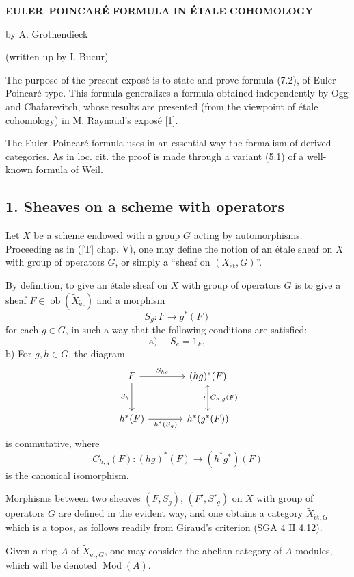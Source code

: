 \documentclass[11pt]{article}
\providecommand{\et}{\mathrm{\acute{e}t}}
\providecommand{\Ob}{\operatorname{ob}}
\providecommand{\Ob}{\operatorname{ob}}
\providecommand{\Ob}{\operatorname{Ob}}
\providecommand{\Mod}{\operatorname{Mod}}
\providecommand{\Ob}{\operatorname{ob}}
\providecommand{\Ob}{\operatorname{Ob}}
\providecommand{\et}{\acute{e}t}
\begin{document}
\begin{center}
\textbf{EULER--POINCARÉ FORMULA IN ÉTALE COHOMOLOGY}

by A. Grothendieck

(written up by I. Bucur)
\end{center}

The purpose of the present exposé is to state and prove formula (7.2), of Euler--Poincaré type. This formula generalizes a formula obtained independently by Ogg and Chafarevitch, whose results are presented (from the viewpoint of étale cohomology) in M. Raynaud's exposé [1].

The Euler--Poincaré formula uses in an essential way the formalism of derived categories. As in loc. cit. the proof is made through a variant (5.1) of a well-known formula of Weil.

\subsection*{1. Sheaves on a scheme with operators}

Let $X$ be a scheme endowed with a group $G$ acting by automorphisms. Proceeding as in ([T] chap. V), one may define the notion of an étale sheaf on $X$ with group of operators $G$, or simply a “sheaf on $(X_{\et},G)$”.

By definition, to give an étale sheaf on $X$ with group of operators $G$ is to give a sheaf $F\in \Ob(\widetilde X_{\et})$ and a morphism
\[
S_g:F\longrightarrow g^*(F)
\]
for each $g\in G$, in such a way that the following conditions are satisfied:
\[
\text{a) }\quad S_e=1_F,
\]
b) For $g,h\in G$, the diagram
\[
\begin{tikzcd}[column sep=large,row sep=large]
F \arrow[r,"S_{hg}"] \arrow[d,"S_h"'] & (hg)^*(F) \arrow[d,leftrightarrow,"\wr"',"C_{h,g}(F)"]\\
h^*(F) \arrow[r,"h^*(S_g)"'] & h^*(g^*(F))
\end{tikzcd}
\]
is commutative, where
\[
C_{h,g}(F):(hg)^*(F)\longrightarrow (h^*g^*)(F)
\]
is the canonical isomorphism.

Morphisms between two sheaves $(F,S_g)$, $(F',S'_g)$ on $X$ with group of operators $G$ are defined in the evident way, and one obtains a category $\widetilde X_{\et,G}$ which is a topos, as follows readily from Giraud's criterion (SGA 4 II 4.12).

Given a ring $A$ of $\widetilde X_{\et,G}$, one may consider the abelian category of $A$-modules, which will be denoted $\Mod(A)$.
\end{document}

